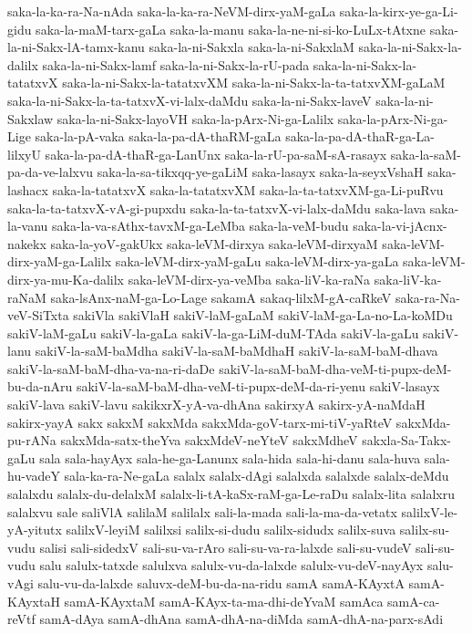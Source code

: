 {saka-la-ka-ra-Na-nAda
saka-la-ka-ra-NeVM-dirx-yaM-gaLa
saka-la-kirx-ye-ga-Li-gidu
saka-la-maM-tarx-gaLa
saka-la-manu
saka-la-ne-ni-si-ko-LuLx-tAtxne
saka-la-ni-Sakx-lA-tamx-kanu
saka-la-ni-Sakxla
saka-la-ni-SakxlaM
saka-la-ni-Sakx-la-dalilx
saka-la-ni-Sakx-lamf
saka-la-ni-Sakx-la-rU-pada
saka-la-ni-Sakx-la-tatatxvX
saka-la-ni-Sakx-la-tatatxvXM
saka-la-ni-Sakx-la-ta-tatxvXM-gaLaM
saka-la-ni-Sakx-la-ta-tatxvX-vi-lalx-daMdu
saka-la-ni-Sakx-laveV
saka-la-ni-Sakxlaw
saka-la-ni-Sakx-layoVH
saka-la-pArx-Ni-ga-Lalilx
saka-la-pArx-Ni-ga-Lige
saka-la-pA-vaka
saka-la-pa-dA-thaRM-gaLa
saka-la-pa-dA-thaR-ga-La-lilxyU
saka-la-pa-dA-thaR-ga-LanUnx
saka-la-rU-pa-saM-sA-rasayx
saka-la-saM-pa-da-ve-lalxvu
saka-la-sa-tikxqq-ye-gaLiM
saka-lasayx
saka-la-seyxVshaH
saka-lashacx
saka-la-tatatxvX
saka-la-tatatxvXM
saka-la-ta-tatxvXM-ga-Li-puRvu
saka-la-ta-tatxvX-vA-gi-pupxdu
saka-la-ta-tatxvX-vi-lalx-daMdu
saka-lava
saka-la-vanu
saka-la-va-sAthx-tavxM-ga-LeMba
saka-la-veM-budu
saka-la-vi-jAcnx-nakekx
saka-la-yoV-gakUkx
saka-leVM-dirxya
saka-leVM-dirxyaM
saka-leVM-dirx-yaM-ga-Lalilx
saka-leVM-dirx-yaM-gaLu
saka-leVM-dirx-ya-gaLa
saka-leVM-dirx-ya-mu-Ka-dalilx
saka-leVM-dirx-ya-veMba
saka-liV-ka-raNa
saka-liV-ka-raNaM
saka-lsAnx-naM-ga-Lo-Lage
sakamA
sakaq-lilxM-gA-caRkeV
saka-ra-Na-veV-SiTxta
sakiVla
sakiVlaH
sakiV-laM-gaLaM
sakiV-laM-ga-La-no-La-koMDu
sakiV-laM-gaLu
sakiV-la-gaLa
sakiV-la-ga-LiM-duM-TAda
sakiV-la-gaLu
sakiV-lanu
sakiV-la-saM-baMdha
sakiV-la-saM-baMdhaH
sakiV-la-saM-baM-dhava
sakiV-la-saM-baM-dha-va-na-ri-daDe
sakiV-la-saM-baM-dha-veM-ti-pupx-deM-bu-da-nAru
sakiV-la-saM-baM-dha-veM-ti-pupx-deM-da-ri-yenu
sakiV-lasayx
sakiV-lava
sakiV-lavu
sakikxrX-yA-va-dhAna
sakirxyA
sakirx-yA-naMdaH
sakirx-yayA
sakx
sakxM
sakxMda
sakxMda-goV-tarx-mi-tiV-yaRteV
sakxMda-pu-rANa
sakxMda-satx-theYva
sakxMdeV-neYteV
sakxMdheV
sakxla-Sa-Takx-gaLu
sala
sala-hayAyx
sala-he-ga-Lanunx
sala-hida
sala-hi-danu
sala-huva
sala-hu-vadeY
sala-ka-ra-Ne-gaLa
salalx
salalx-dAgi
salalxda
salalxde
salalx-deMdu
salalxdu
salalx-du-delalxM
salalx-li-tA-kaSx-raM-ga-Le-raDu
salalx-lita
salalxru
salalxvu
sale
saliVlA
salilaM
salilalx
sali-la-mada
sali-la-ma-da-vetatx
salilxV-le-yA-yitutx
salilxV-leyiM
salilxsi
salilx-si-dudu
salilx-sidudx
salilx-suva
salilx-su-vudu
salisi
sali-sidedxV
sali-su-va-rAro
sali-su-va-ra-lalxde
sali-su-vudeV
sali-su-vudu
salu
salulx-tatxde
salulxva
salulx-vu-da-lalxde
salulx-vu-deV-nayAyx
salu-vAgi
salu-vu-da-lalxde
saluvx-deM-bu-da-na-ridu
samA
samA-KAyxtA
samA-KAyxtaH
samA-KAyxtaM
samA-KAyx-ta-ma-dhi-deYvaM
samAca
samA-ca-reVtf
samA-dAya
samA-dhAna
samA-dhA-na-diMda
samA-dhA-na-parx-sAdi
}
